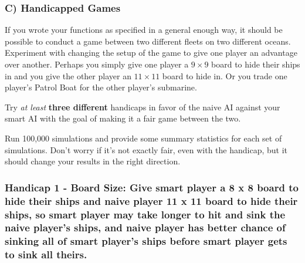 \documentclass[
]{article}
\begin{document}
\subsubsection{C) Handicapped Games}\label{c-handicapped-games}

If you wrote your functions as specified in a general enough way, it
should be possible to conduct a game between two different fleets on two
different oceans. Experiment with changing the setup of the game to give
one player an advantage over another. Perhaps you simply give one player
a \(9\times 9\) board to hide their ships in and you give the other
player an \(11\times 11\) board to hide in. Or you trade one player's
Patrol Boat for the other player's submarine.

Try \emph{at least} \textbf{three different} handicaps in favor of the
naive AI against your smart AI with the goal of making it a fair game
between the two.

Run 100,000 simulations and provide some summary statistics for each set
of simulations. Don't worry if it's not exactly fair, even with the
handicap, but it should change your results in the right direction.

\subsubsection{Handicap 1 - Board Size: Give smart player a 8 x 8 board
to hide their ships and naive player 11 x 11 board to hide their ships,
so smart player may take longer to hit and sink the naive player's
ships, and naive player has better chance of sinking all of smart
player's ships before smart player gets to sink all
theirs.}\label{handicap-1---board-size-give-smart-player-a-8-x-8-board-to-hide-their-ships-and-naive-player-11-x-11-board-to-hide-their-ships-so-smart-player-may-take-longer-to-hit-and-sink-the-naive-players-ships-and-naive-player-has-better-chance-of-sinking-all-of-smart-players-ships-before-smart-player-gets-to-sink-all-theirs.}
\end{document}
